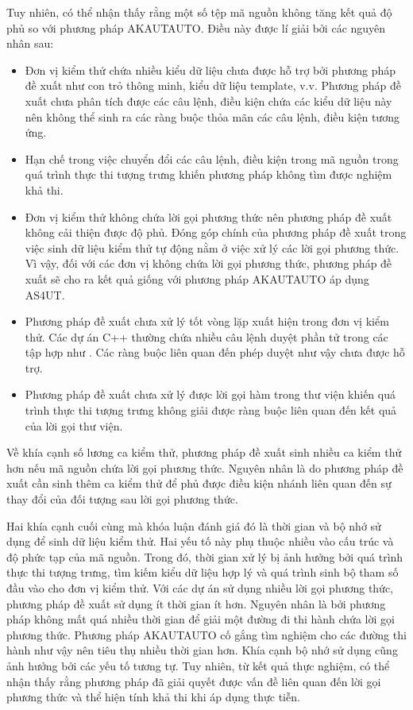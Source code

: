 Tuy nhiên, có thể nhận thấy rằng một số tệp mã nguồn không tăng kết quả độ phủ so với phương pháp AKAUTAUTO. Điều này được lí giải bởi các nguyên nhân sau:
\begin{itemize}
    \item Đơn vị kiểm thử chứa nhiều kiểu dữ liệu chưa được hỗ trợ bởi phương pháp đề xuất như con trỏ thông minh, kiểu dữ liệu template, v.v. Phương pháp đề xuất chưa phân tích được các câu lệnh, điều kiện chứa các kiểu dữ liệu này nên không thể sinh ra các ràng buộc thỏa mãn các câu lệnh, điều kiện tương ứng.
    
    \item Hạn chế trong việc chuyển đổi các câu lệnh, điều kiện trong mã nguồn trong quá trình thực thi tượng trưng khiến phương pháp không tìm được nghiệm khả thi.
    
    \item Đơn vị kiểm thử không chứa lời gọi phương thức nên phương pháp đề xuất không cải thiện được độ phủ. Đóng góp chính của phương pháp đề xuất trong việc sinh dữ liệu kiểm thử tự động nằm ở việc xử lý các lời gọi phương thức. Vì vậy, đối với các đơn vị không chứa lời gọi phương thức, phương pháp đề xuất sẽ cho ra kết quả giống với phương pháp AKAUTAUTO áp dụng AS4UT.
    
    \item Phương pháp đề xuất chưa xử lý tốt vòng lặp xuất hiện trong đơn vị kiểm thử. Các dự án C++ thường chứa nhiều câu lệnh duyệt phần tử trong các tập hợp như . Các ràng buộc liên quan đến phép duyệt như vậy chưa được hỗ trợ.
    
    \item Phương pháp đề xuất chưa xử lý được lời gọi hàm trong thư viện khiến quá trình thực thi tượng trưng không giải được ràng buộc liên quan đến kết quả của lời gọi thư viện.
\end{itemize}

Về khía cạnh số lương ca kiểm thử, phương pháp đề xuất sinh nhiều ca kiểm thử hơn nếu mã nguồn chứa lời gọi phương thức. Nguyên nhân là do phương pháp đề xuất cần sinh thêm ca kiểm thử để phủ được điều kiện nhánh liên quan đến sự thay đổi của đối tượng sau lời gọi phương thức.

Hai khía cạnh cuối cùng mà khóa luận đánh giá đó là thời gian và bộ nhớ sử dụng để sinh dữ liệu kiểm thử. Hai yếu tố này phụ thuộc nhiều vào cấu trúc và độ phức tạp của mã nguồn. Trong đó, thời gian xử lý bị ảnh hưởng bởi quá trình thực thi tượng trưng, tìm kiếm kiểu dữ liệu hợp lý và quá trình sinh bộ tham số đầu vào cho đơn vị kiểm thử. Với các dự án sử dụng nhiều lời gọi phương thức, phương pháp đề xuất sử dụng ít thời gian ít hơn. Nguyên nhân là bởi phương pháp không mất quá nhiều thời gian để giải một đường đi thi hành chứa lời gọi phương thức. Phương pháp AKAUTAUTO cố gắng tìm nghiệm cho các đường thi hành như vậy nên tiêu thụ nhiều thời gian hơn. Khía cạnh bộ nhớ sử dụng cũng ảnh hưởng bởi các yếu tố tương tự. Tuy nhiên, từ kết quả thực nghiệm, có thể nhận thấy rằng phương pháp đã giải quyết được vấn đề liên quan đến lời gọi phương thức và thể hiện tính khả thi khi áp dụng thực tiễn.
